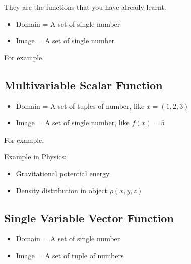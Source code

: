 \documentclass[class=article, crop=false, 12pt]{standalone}
\begin{document}
They are the functions that you have already learnt.

\begin{itemize}
    \item Domain = A set of single number
    \item Image = A set of single number 
\end{itemize}

For example, 




\subsection{Multivariable Scalar Function}

\begin{itemize}
    \item Domain = A set of tuples of number, like $x = (1,2,3)$
    \item Image = A set of single number, like $f(x) = 5$
\end{itemize}

For example,


\ul{Example in Physics:}
\begin{itemize}
    \item Gravitational potential energy

    \item Density distribution in object $\rho(x,y,z)$
\end{itemize}


\subsection{Single Variable Vector Function}

\begin{itemize}
    \item Domain = A set of single number
    \item Image = A set of tuple of numbers
\end{itemize}
\end{document}
